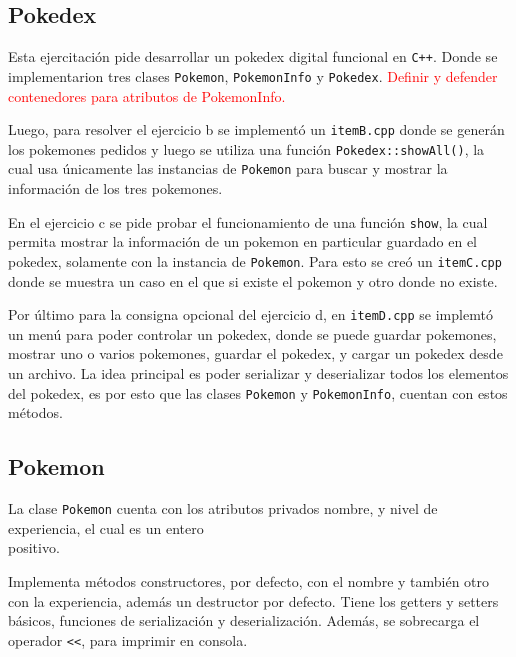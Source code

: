 \documentclass[11pt, a4paper]{article}
\begin{document}
\begin{multicols}{2}

\section{Pokedex}

Esta ejercitación pide desarrollar un pokedex digital funcional en \lstinline|C++|. Donde se implementarion tres clases \lstinline|Pokemon|, \lstinline|PokemonInfo| y \lstinline|Pokedex|. \textcolor{red}{Definir y defender contenedores para atributos de PokemonInfo.}

Luego, para resolver el ejercicio b se implementó un \lstinline|itemB.cpp| donde se generán los pokemones pedidos y luego se utiliza una función \lstinline|Pokedex::showAll()|, la cual usa únicamente las instancias de \lstinline|Pokemon| para buscar y mostrar la información de los tres pokemones.

En el ejercicio c se pide probar el funcionamiento de una función \lstinline|show|, la cual permita mostrar la información de un pokemon en particular guardado en el pokedex, solamente con la instancia de \lstinline|Pokemon|. Para esto se creó un \lstinline|itemC.cpp| donde se muestra un caso en el que si existe el pokemon y otro donde no existe.

Por último para la consigna opcional del ejercicio d, en \lstinline|itemD.cpp| se implemtó un menú para poder controlar un pokedex, donde se puede guardar pokemones, mostrar uno o varios pokemones, guardar el pokedex, y cargar un pokedex desde un archivo. La idea principal es poder serializar y deserializar todos los elementos del pokedex, es por esto que las clases \lstinline|Pokemon| y \lstinline|PokemonInfo|, cuentan con estos métodos.

\subsection{Pokemon}

La clase \lstinline|Pokemon| cuenta con los atributos privados nombre, y nivel de experiencia, el cual es un entero \\positivo.

Implementa métodos constructores, por defecto, con el nombre y también otro con la experiencia, además un destructor por defecto. Tiene los getters y setters básicos, funciones de serialización y deserialización. Además, se sobrecarga el operador \lstinline|<<|, para imprimir en consola.


\end{multicols}
\end{document}
